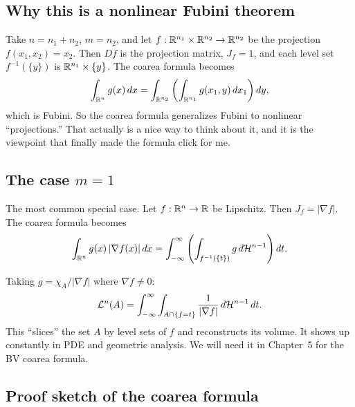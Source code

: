 \subsection{Why this is a nonlinear Fubini theorem}

Take $n = n_1 + n_2$, $m = n_2$, and let $f : \mathbb{R}^{n_1} \times \mathbb{R}^{n_2} \to \mathbb{R}^{n_2}$ be the projection $f(x_1, x_2) = x_2$. Then $Df$ is the projection matrix, $J_f = 1$, and each level set $f^{-1}(\{y\})$ is $\mathbb{R}^{n_1} \times \{y\}$. The coarea formula becomes
\[
  \int_{\mathbb{R}^n} g(x) \, dx = \int_{\mathbb{R}^{n_2}} \left( \int_{\mathbb{R}^{n_1}} g(x_1, y) \, dx_1 \right) dy,
\]
which is Fubini. So the coarea formula generalizes Fubini to nonlinear ``projections.'' That actually is a nice way to think about it, and it is the viewpoint that finally made the formula click for me.


\subsection{The case $m = 1$}

The most common special case. Let $f : \mathbb{R}^n \to \mathbb{R}$ be Lipschitz. Then $J_f = |\nabla f|$. The coarea formula becomes
\[
  \int_{\mathbb{R}^n} g(x) \, |\nabla f(x)| \, dx = \int_{-\infty}^{\infty} \left( \int_{f^{-1}(\{t\})} g \, d\mathcal{H}^{n-1} \right) dt.
\]

Taking $g = \chi_A / |\nabla f|$ where $\nabla f \neq 0$:
\[
  \mathcal{L}^n(A) = \int_{-\infty}^{\infty} \int_{A \cap \{f = t\}} \frac{1}{|\nabla f|} \, d\mathcal{H}^{n-1} \, dt.
\]
This ``slices'' the set $A$ by level sets of $f$ and reconstructs its volume. It shows up constantly in PDE and geometric analysis. We will need it in Chapter~5 for the BV coarea formula.


\subsection{Proof sketch of the coarea formula}

